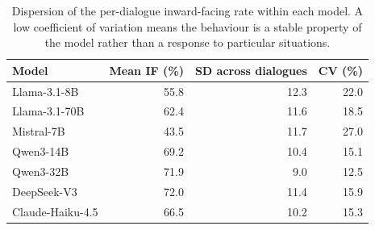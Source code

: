 \begin{table}[t]
\centering
\small
\caption{Dispersion of the per-dialogue inward-facing rate within each model. A low coefficient of variation means the behaviour is a stable property of the model rather than a response to particular situations.}
\label{tab:consistency}
\begin{tabular}{lrrr}
\toprule
Model & Mean IF (\%) & SD across dialogues & CV (\%) \\
\midrule
Llama-3.1-8B & 55.8 & 12.3 & 22.0 \\
Llama-3.1-70B & 62.4 & 11.6 & 18.5 \\
Mistral-7B & 43.5 & 11.7 & 27.0 \\
Qwen3-14B & 69.2 & 10.4 & 15.1 \\
Qwen3-32B & 71.9 & 9.0 & 12.5 \\
DeepSeek-V3 & 72.0 & 11.4 & 15.9 \\
Claude-Haiku-4.5 & 66.5 & 10.2 & 15.3 \\
\bottomrule
\end{tabular}
\end{table}
